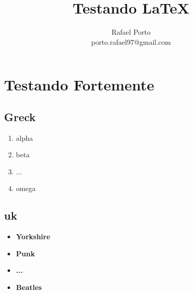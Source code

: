 \documentclass[12pt]{article}
\title{Testando \LaTeX}
\author{Rafael Porto \\ porto.rafael97@gmail.com}
\begin{document}
\chapter{\textbf{Testando Fortemente}}

\section{Greck}

\begin{enumerate}
\item alpha 
\item beta
\item ...
\item omega
\end{enumerate}

\section{uk}

\begin{itemize}
\item \bf{Yorkshire}  
\item \bf{Punk}
\item \bf{...}
\item \bf{Beatles}
\end{itemize}
\end{document}
